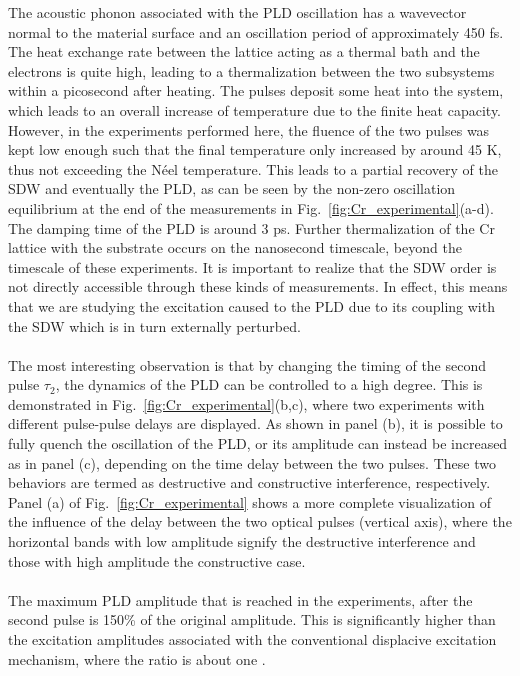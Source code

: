 The acoustic phonon associated with the PLD oscillation has a wavevector normal to the material surface and an oscillation period of approximately 450 fs.
The heat exchange rate between the lattice acting as a thermal bath and the electrons is quite high, leading to a thermalization between the two subsystems within a picosecond after heating.
The pulses deposit some heat into the system, which leads to an overall increase of temperature due to the finite heat capacity.
However, in the experiments performed here, the fluence of the two pulses was kept low enough such that the final temperature only increased by around 45 K, thus not exceeding the N\'eel temperature.
This leads to a partial recovery of the SDW and eventually the PLD, as can be seen by the non-zero oscillation equilibrium at the end of the measurements in Fig.~\ref{fig:Cr_experimental}(a-d).
The damping time of the PLD is around 3 ps.
Further thermalization of the Cr lattice with the substrate occurs on the nanosecond timescale, beyond the timescale of these experiments.
It is important to realize that the SDW order is not directly accessible through these kinds of measurements. In effect, this means that we are studying the excitation caused to the PLD due to its coupling with the SDW which is in turn externally perturbed.
\\\\
The most interesting observation is that by changing the timing of the second pulse $\tau_2$, the dynamics of the PLD can be controlled to a high degree.
This is demonstrated in Fig.~\ref{fig:Cr_experimental}(b,c), where two experiments with different pulse-pulse delays are displayed.
As shown in panel (b), it is possible to fully quench the oscillation of the PLD, or its amplitude can instead be increased as in panel (c), depending on the time delay between the two pulses.
These two behaviors are termed as destructive and constructive interference, respectively.
Panel (a) of Fig.~\ref{fig:Cr_experimental} shows a more complete visualization of the influence of the delay between the two optical pulses (vertical axis), where the horizontal bands with low amplitude signify the destructive interference and those with high amplitude the constructive case.
\\\\
The maximum PLD amplitude that is reached in the experiments, after the second pulse is 150\% of the original amplitude.
This is significantly higher than the excitation amplitudes associated with the conventional displacive excitation mechanism, where the ratio is about one \cite{Singer2015prl,Zeiger1992}. 
